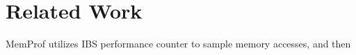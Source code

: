 \section{Related Work}
\label{sec:related}

MemProf utilizes IBS performance counter to sample memory accesses, and then ~\cite{Lachaize:2012:MMP:2342821.2342826}